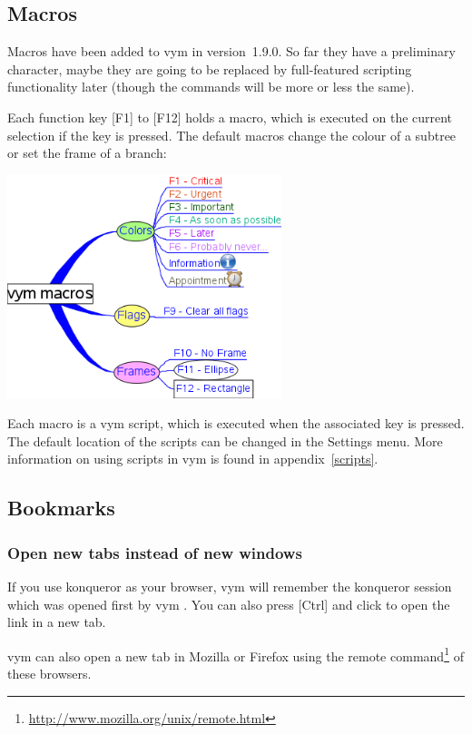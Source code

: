 \documentclass[12pt,a4paper]{article}
\newcommand{\vym}{{\sc vym }}
\newcommand{\key}[1]{[#1]}
\begin{document}
\subsection{Macros} \label{macros}
Macros have been added to \vym in version~1.9.0. 
So far they have a preliminary character, maybe they are going to be
replaced by full-featured scripting functionality later (though the
commands will be more or less the same).

Each function key
\key{F1} to \key{F12} holds a macro, which is executed on the current
selection if the key is pressed. The default macros change the colour of
a subtree or set the frame of a branch:
\begin{center}
    \includegraphics[width=8cm]{images/macros.png}
\end{center}
Each macro is a \vym script, which is executed when the associated key
is pressed. The default location of the scripts can be changed in the
Settings menu. More information on using scripts in \vym is found in
appendix~\ref{scripts}.

\subsection{Bookmarks} \label{bookmarks}
\subsubsection*{Open new tabs instead of new windows}
If you use konqueror as your browser, \vym will remember the konqueror session which
was opened first by \vym. You can also press \key{Ctrl} and click to
open the link in a new tab.

\vym can also open a new tab in Mozilla or Firefox using the remote
command\footnote{
    \href{http://www.mozilla.org/unix/remote.html}{http://www.mozilla.org/unix/remote.html}}
of these browsers.
\end{document}
